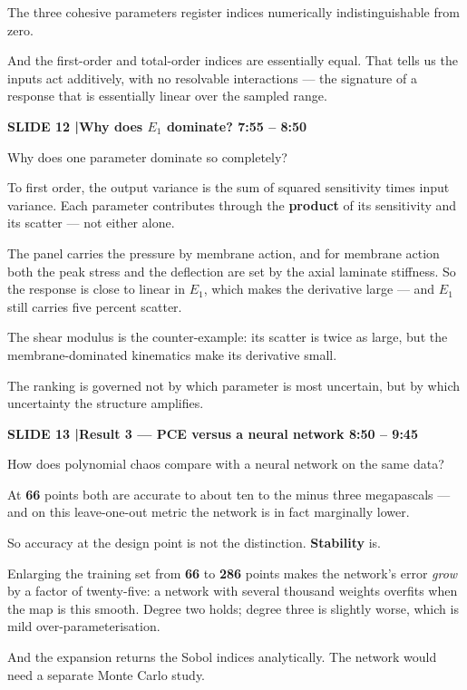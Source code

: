 \documentclass[12pt,a4paper]{article}
\newcommand{\slide}[3]{%
  \bigskip
  \noindent\colorbox{luhblue}{\parbox{\dimexpr\linewidth-2\fboxsep}{%
    \color{white}\bfseries\small SLIDE #1 \quad|\quad #2 \hfill #3}}\par
  \nopagebreak\vspace{0.3em}}
\newcommand{\num}[1]{\textbf{#1}}
\begin{document}
The three cohesive parameters register indices numerically indistinguishable from zero.

And the first-order and total-order indices are essentially equal. That tells us the
inputs act additively, with no resolvable interactions --- the signature of a response
that is essentially linear over the sampled range.

\slide{12}{Why does $E_1$ dominate?}{7:55 -- 8:50}

Why does one parameter dominate so completely?

To first order, the output variance is the sum of squared sensitivity times input
variance. Each parameter contributes through the \textbf{product} of its sensitivity and
its scatter --- not either alone.

The panel carries the pressure by membrane action, and for membrane action both the peak
stress and the deflection are set by the axial laminate stiffness. So the response is
close to linear in $E_1$, which makes the derivative large --- and $E_1$ still carries
five percent scatter.

The shear modulus is the counter-example: its scatter is twice as large, but the
membrane-dominated kinematics make its derivative small.

The ranking is governed not by which parameter is most uncertain, but by which uncertainty
the structure amplifies.

\slide{13}{Result 3 --- PCE versus a neural network}{8:50 -- 9:45}

How does polynomial chaos compare with a neural network on the same data?

At \num{66} points both are accurate to about ten to the minus three megapascals ---
and on this leave-one-out metric the network is in fact marginally lower.

So accuracy at the design point is not the distinction. \textbf{Stability} is.

Enlarging the training set from \num{66} to \num{286} points makes the network's
error \emph{grow} by a factor of twenty-five: a network with several thousand weights
overfits when the map is this smooth. Degree two holds; degree three is slightly worse,
which is mild over-parameterisation.

And the expansion returns the Sobol indices analytically. The network would need a
separate Monte Carlo study.
\end{document}
